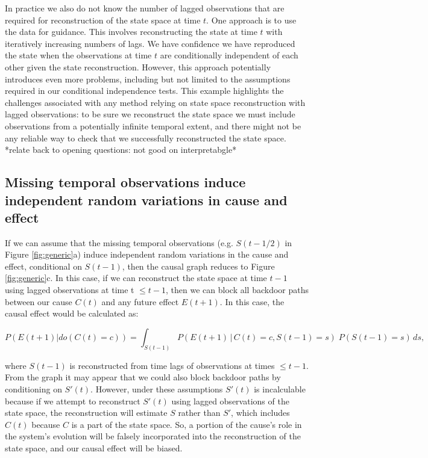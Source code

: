 \documentclass[12pt]{article}
\begin{document}
In practice we also do not know the number of lagged observations that
are required for reconstruction of the state space at time $t$. One
approach is to use the data for guidance. This involves reconstructing
the state at time $t$ with iteratively increasing numbers of lags. We
have confidence we have reproduced the state when the observations at
time $t$ are conditionally independent of each other given the state
reconstruction. However, this approach potentially introduces even
more problems, including but not limited to the assumptions required
in our conditional independence tests. This example highlights the
challenges associated with any method relying on state space
reconstruction with lagged observations: to be sure we reconstruct the
state space we must include observations from a potentially infinite
temporal extent, and there might not be any reliable way to check that
we successfully reconstructed the state space. *relate back to opening
questions: not good on interpretabgle*

\subsection{Missing temporal observations induce independent random
  variations in cause and effect}
\label{sec:miss-temp-observ}

If we can assume that the missing temporal observations
(e.g. $S(t-1/2)$ in Figure \ref{fig:generic}a) induce independent
random variations in the cause and effect, conditional on $S(t-1)$,
then the causal graph reduces to Figure \ref{fig:generic}c. In this
case, if we can reconstruct the state space at time $t-1$ using lagged
observations at time t $\leq t-1$, then we can block all backdoor
paths between our cause $C(t)$ and any future effect $E(t+1)$. In this
case, the causal effect would be calculated as:

\begin{equation}
  P(E(t+1)| do(C(t)=c)) = \int_{S(t-1)} P(E(t+1) \, | \, C(t)=c,
  S(t-1) = s
  )\; P(S(t-1)=s) \, d s,
\end{equation}

where $S(t-1)$ is reconstructed from time lags of observations at
times $\leq t-1$. From the graph it may appear that we could also
block backdoor paths by conditioning on $S'(t)$. However, under these
assumptions $S'(t)$ is incalculable because if we attempt to
reconstruct $S'(t)$ using lagged observations of the state space, the
reconstruction will estimate $S$ rather than $S'$, which includes
$C(t)$ because $C$ is a part of the state space. So, a portion of the
cause's role in the system's evolution will be falsely incorporated
into the reconstruction of the state space, and our causal effect will
be biased.
\end{document}
